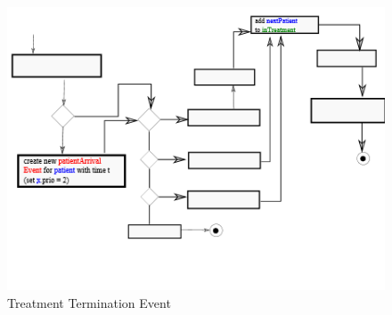 \documentclass[12pt,fleqn,a4paper]{article}
\begin{document}
\begin{figure}[h]
	\centering
	\includegraphics{img/TreatmentTermination}
	\caption{Treatment Termination Event}
\end{figure}





\newpage
\end{document}
